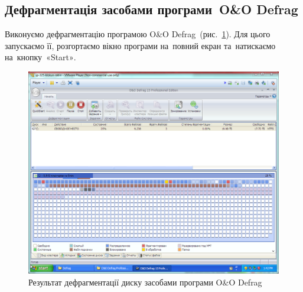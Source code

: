 \documentclass[
	a4paper,
	oneside,
	DIV = 12,
	fontsize = 13pt,
	headings = normal,
]{scrartcl}
\begin{document}
		\subsection{Дефрагментація засобами програми~\textenglish{O\&O Defrag}}
			Виконуємо дефрагментацію програмою \textenglish{O\&O Defrag}~(рис.~\ref{fig:05-o-et-o-defrag}). Для цього запускаємо її, розгортаємо вікно програми на~повний екран та~натискаємо на~кнопку~\textenglish{«Start»}.
			\begin{figure}[!htbp]
				\centering
				\includegraphics[height = 8\baselineskip]{./assets/lab-02-06.png}
				\caption{Результат дефрагментації диску засобами програми \textenglish{O\&O Defrag}}
				\label{fig:05-o-et-o-defrag}
			\end{figure}
\end{document}
